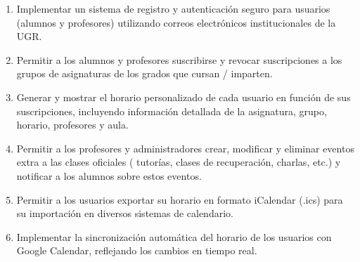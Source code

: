 \begin{enumerate}
    \item Implementar un sistema de registro y autenticación seguro para usuarios (alumnos y profesores) utilizando correos electrónicos institucionales de la UGR.
    \item Permitir a los alumnos y profesores suscribirse y revocar suscripciones a los grupos de asignaturas de los grados que cursan / imparten.
    \item Generar y mostrar el horario personalizado de cada usuario en función de sus suscripciones, incluyendo información detallada de la asignatura, grupo, horario, profesores y aula.
    \item Permitir a los profesores y administradores crear, modificar y eliminar eventos extra a las clases oficiales ( tutorías, clases de recuperación, charlas, etc.) y notificar a los alumnos sobre estos eventos.
    \item Permitir a los usuarios exportar su horario en formato iCalendar (.ics) para su importación en diversos sistemas de calendario.
    \item Implementar la sincronización automática del horario de los usuarios con Google Calendar, reflejando los cambios en tiempo real.
\end{enumerate}
